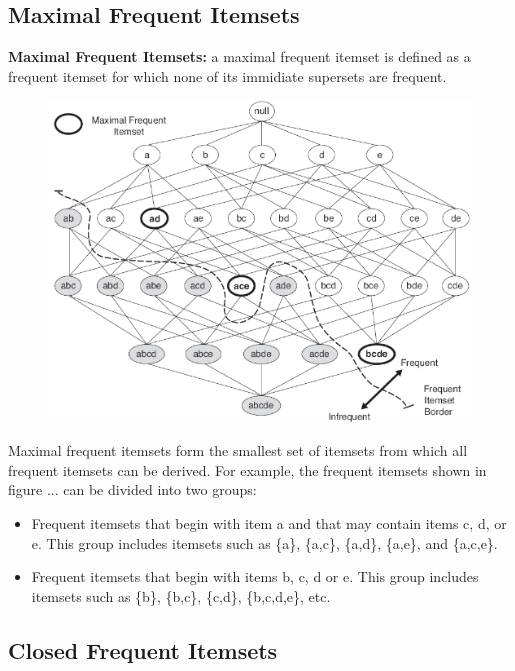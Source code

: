 		\subsection{Maximal Frequent Itemsets}

		{\bf Maximal Frequent Itemsets:} a maximal frequent itemset is defined as a frequent
 		itemset for which none of its immidiate supersets are frequent.

 			\begin{figure}[H]
 				\centering
 				\includegraphics[scale=0.6]{pics/maximal.png}
 			\end{figure}

 		Maximal frequent itemsets form the smallest set of itemsets from which all frequent 
 		itemsets can be derived. For example, the frequent itemsets shown in figure ...
 		can be divided into two groups:

 		\begin{itemize}
 			\item Frequent itemsets that begin with item a and that may contain items
 			c, d, or e. This group includes itemsets such as \{a\}, \{a,c\}, \{a,d\},
 			\{a,e\}, and \{a,c,e\}.
 			\item Frequent itemsets that begin with items b, c, d or e. This group
 			includes itemsets such as \{b\}, \{b,c\}, \{c,d\}, \{b,c,d,e\}, etc.
 		\end{itemize}

 		\clearpage
 		\subsection{Closed Frequent Itemsets} 

